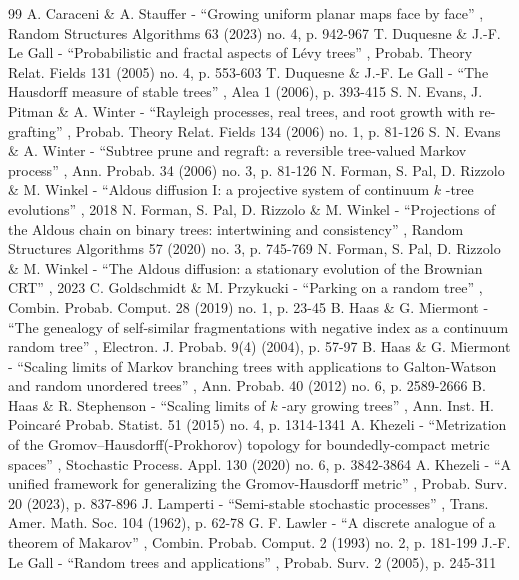 \documentclass[11pt]{article}
\theoremstyle{definition}
\begin{document}
\begin{thebibliography}{99}
 A. Caraceni \& A. Stauffer - “Growing uniform planar maps face by face” , Random Structures Algorithms 63 (2023) no. 4, p. 942-967
 T. Duquesne \& J.-F. Le Gall - “Probabilistic and fractal aspects of Lévy trees” , Probab. Theory Relat. Fields 131 (2005) no. 4, p. 553-603
 T. Duquesne \& J.-F. Le Gall - “The Hausdorff measure of stable trees” , Alea 1 (2006), p. 393-415
 S. N. Evans, J. Pitman \& A. Winter - “Rayleigh processes, real trees, and root growth with re-grafting” , Probab. Theory Relat. Fields 134 (2006) no. 1, p. 81-126
 S. N. Evans \& A. Winter - “Subtree prune and regraft: a reversible tree-valued Markov process” , Ann. Probab. 34 (2006) no. 3, p. 81-126
 N. Forman, S. Pal, D. Rizzolo \& M. Winkel - “Aldous diffusion I: a projective system of continuum $k$ -tree evolutions” , 2018
 N. Forman, S. Pal, D. Rizzolo \& M. Winkel - “Projections of the Aldous chain on binary trees: intertwining and consistency” , Random Structures Algorithms 57 (2020) no. 3, p. 745-769
 N. Forman, S. Pal, D. Rizzolo \& M. Winkel - “The Aldous diffusion: a stationary evolution of the Brownian CRT” , 2023
 C. Goldschmidt \& M. Przykucki - “Parking on a random tree” , Combin. Probab. Comput. 28 (2019) no. 1, p. 23-45
 B. Haas \& G. Miermont - “The genealogy of self-similar fragmentations with negative index as a continuum random tree” , Electron. J. Probab. 9(4) (2004), p. 57-97
 B. Haas \& G. Miermont - “Scaling limits of Markov branching trees with applications to Galton-Watson and random unordered trees” , Ann. Probab. 40 (2012) no. 6, p. 2589-2666
 B. Haas \& R. Stephenson - “Scaling limits of $k$ -ary growing trees” , Ann. Inst. H. Poincaré Probab. Statist. 51 (2015) no. 4, p. 1314-1341
 A. Khezeli - “Metrization of the Gromov–Hausdorff(-Prokhorov) topology for boundedly-compact metric spaces” , Stochastic Process. Appl. 130 (2020) no. 6, p. 3842-3864
 A. Khezeli - “A unified framework for generalizing the Gromov-Hausdorff metric” , Probab. Surv. 20 (2023), p. 837-896
 J. Lamperti - “Semi-stable stochastic processes” , Trans. Amer. Math. Soc. 104 (1962), p. 62-78
 G. F. Lawler - “A discrete analogue of a theorem of Makarov” , Combin. Probab. Comput. 2 (1993) no. 2, p. 181-199
 J.-F. Le Gall - “Random trees and applications” , Probab. Surv. 2 (2005), p. 245-311

\end{thebibliography}
\end{document}
